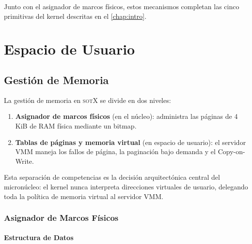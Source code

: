 \documentclass[11pt,twoside,openright]{book}
\theoremstyle{definition}
\theoremstyle{plain}
\theoremstyle{remark}
\newcommand{\sotos}{\textsc{sotX}}
\begin{document}
Junto con el asignador de marcos físicos, estos mecanismos completan las cinco primitivas
del kernel descritas en el \cref{chap:intro}.

%
%

\part{Espacio de Usuario}

\chapter{Gestión de Memoria}
\label{chap:memoria}

La gestión de memoria en \sotos{} se divide en dos niveles:
\begin{enumerate}
    \item \textbf{Asignador de marcos físicos} (en el núcleo): administra las páginas
          de 4\,KiB de RAM física mediante un bitmap.
    \item \textbf{Tablas de páginas y memoria virtual} (en espacio de usuario): el
          servidor VMM maneja los fallos de página, la paginación bajo demanda y el
          Copy-on-Write.
\end{enumerate}

Esta separación de competencias es la decisión arquitectónica central del micronúcleo:
el kernel nunca interpreta direcciones virtuales de usuario, delegando toda la política
de memoria virtual al servidor VMM.

\section{Asignador de Marcos Físicos}
\label{sec:frame-alloc}

\subsection{Estructura de Datos}
\end{document}
